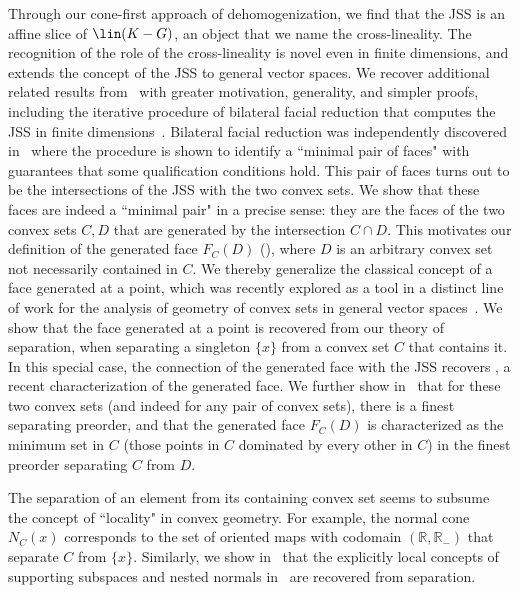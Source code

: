 \documentclass{article}
\theoremstyle{plain}
\theoremstyle{definition}
\theoremstyle{remark}
\begin{document}
Through our cone-first approach of dehomogenization, we find that the
JSS is an affine slice of $\lin(K-G)$, an object that we name the cross-lineality.
The recognition of the role of the cross-lineality is novel even in finite
dimensions, and extends the concept of the JSS to general vector spaces. 
We recover additional related results from~\cite{scottBilateralFacialReduction2026} 
with greater motivation, generality, and simpler proofs, including
the iterative procedure of bilateral facial reduction that computes the JSS in finite dimensions~\cite{scottBilateralFacialReduction2026}.
Bilateral facial reduction was independently
discovered in~\cite{linFacialReductionNice2025} where the procedure is shown to identify a ``minimal pair of faces" with guarantees that some qualification conditions hold. This pair of faces turns out to be the
intersections of the JSS with the two convex sets.
We show that these faces are indeed a ``minimal pair" in a precise sense:
they are the faces of the two convex sets $C,D$ that are generated by the intersection $C \cap D$.
This motivates our definition of the generated face $F_C(D)$ (), where $D$
is an arbitrary convex set not necessarily contained in $C$. We thereby generalize the
classical concept of a face generated at a point,
which was recently explored as a tool in a distinct line
of work for the analysis of geometry of convex sets in general vector
spaces~\cite{weisFaceGeneratedPoint2021, weisNoteFacesConvex2025, millanIntrinsicCoreMinimal2023}.
We show that the face generated at a point is recovered from our theory of separation, when separating a
singleton $\{x\}$ from a convex set $C$ that contains it. In this special case,
the connection of the generated face with the JSS recovers \cite[proposition 2.4]{millanIntrinsicCoreMinimal2023},
a recent characterization of the
generated face. We further show in~ that for these two convex sets (and indeed for any
pair of convex sets), there is a finest
separating preorder, and that the generated face $F_C(D)$ is characterized as
the minimum set in $C$ (those points in $C$ dominated by every other in $C$)
in the finest preorder separating $C$ from $D$.

The separation of an element from its containing convex set seems to
subsume the concept of ``locality" in convex geometry.
For example, the normal cone $N_C(x)$ 
corresponds to the set of oriented maps with codomain $(\mathbb{R}, \mathbb{R}_-)$
that separate $C$ from $\{x\}$. 
Similarly, we show in~ that the explicitly local concepts of
supporting subspaces and nested normals in~\cite{scottBilateralFacialReduction2026} are
recovered from separation.
\end{document}
